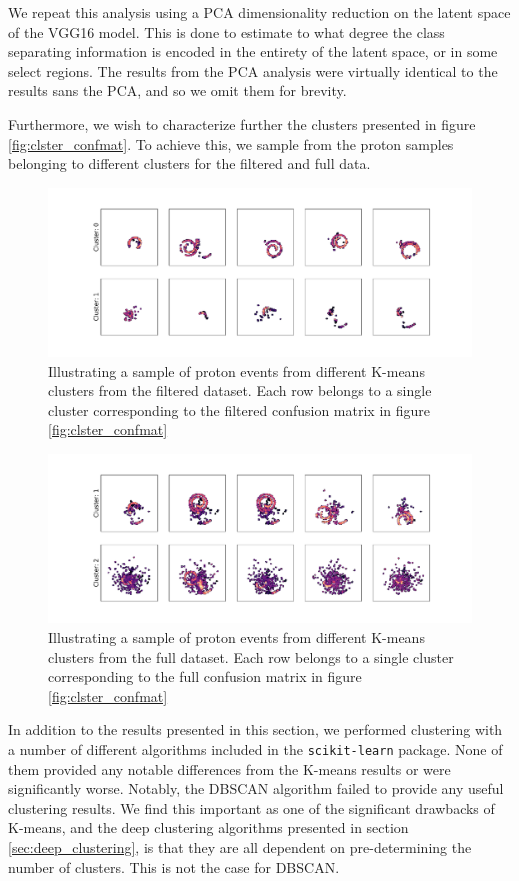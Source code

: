 We repeat this analysis using a PCA dimensionality reduction on the latent space of the VGG16 model. This is done to estimate to what degree the class separating information is encoded in the entirety of the latent space, or in some select regions. The results from the PCA analysis were virtually identical to the results sans the PCA, and so we omit them for brevity. 

Furthermore, we wish to characterize further the clusters presented in figure \ref{fig:clster_confmat}. To achieve this, we sample from the proton samples belonging to different clusters for the filtered and full data.

\begin{figure}
\includegraphics[width=\textwidth]{plots/filtered_vgg_cluster_repr.pdf}
\caption[Filtered proton samples by cluster belonging]{Illustrating a sample of proton events from different K-means clusters from the filtered dataset. Each row belongs to a single cluster corresponding to the filtered confusion matrix in figure \ref{fig:clster_confmat}}\label{fig:filtered_vgg_clster_repr}
\end{figure} 

\begin{figure}
\includegraphics[width=\textwidth]{plots/full_vgg_cluster_repr.pdf}
\caption[Full proton samples by cluster belonging]{Illustrating a sample of proton events from different K-means clusters from the full dataset. Each row belongs to a single cluster corresponding to the full confusion matrix in figure \ref{fig:clster_confmat}}\label{fig:full_vgg_clster_repr}
\end{figure} 

In addition to the results presented in this section, we performed clustering with a number of different algorithms included in the \lstinline{scikit-learn} package. None of them provided any notable differences from the K-means results or were significantly worse. Notably, the DBSCAN algorithm failed to provide any useful clustering results. We find this important as one of the significant drawbacks of K-means, and the deep clustering algorithms presented in section \ref{sec:deep_clustering}, is that they are all dependent on pre-determining the number of clusters. This is not the case for DBSCAN. 